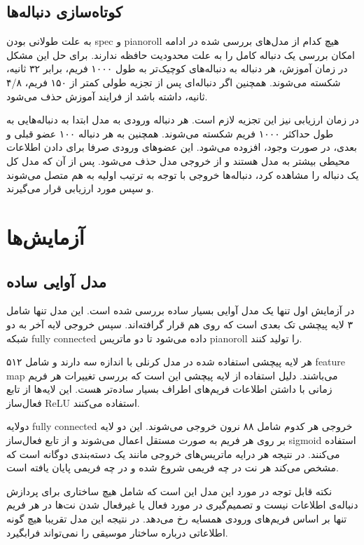 \subsection{کوتاه‌سازی دنباله‌ها}
به علت طولانی بودن \gls{spec} و \gls{pianoroll} هیچ کدام از مدل‌های بررسی شده در
ادامه امکان بررسی یک دنباله کامل را به علت محدودیت حافظه ندارند. برای حل این
مشکل در زمان آموزش، هر دنباله به دنباله‌های کوچیک‌تر به طول ۱۰۰۰ فریم، برابر ۳۲
ثانیه، شکسته می‌شوند. همچنین اگر دنباله‌ای پس از تجزیه طولی کمتر از ۱۵۰ فریم، ۴/۸
ثانیه، داشته باشد از فرایند آموزش حذف می‌شود.

در زمان ارزیابی نیز این تجزیه لازم است. هر دنباله ورودی به مدل ابتدا به
دنباله‌هایی به طول حداکثر ۱۰۰۰ فریم شکسته می‌شوند. همچنین به هر دنباله ۱۰۰ عضو
قبلی و بعدی، در صورت وجود، افزوده می‌شود. این عضوهای ورودی صرفا برای دادن
اطلاعات محیطی بیشتر به مدل هستند و از خروجی مدل حذف می‌شود. پس از آن که مدل کل
یک دنباله را مشاهده کرد، دنباله‌ها خروجی با توجه به ترتیب اولیه به هم متصل
می‌شوند و سپس مورد ارزیابی قرار می‌گیرند.

\section{آزمایش‌ها}
\subsection{مدل آوایی ساده}
در آزمایش اول تنها یک مدل آوایی بسیار ساده بررسی شده است. این مدل تنها شامل ۳
لایه پیچشی تک بعدی است که روی هم قرار گرافته‌اند. سپس خروجی لایه آخر به دو شبکه
\gls{fully connected} داده می‌شود تا دو ماتریس \gls{pianoroll} را تولید کنند.

هر لایه پیچشی استفاده شده در مدل کرنلی با اندازه سه دارند و شامل ۵۱۲
\gls{feature map} می‌باشند. دلیل استفاده از لایه پیچشی این است که بررسی تغییرات
هر فریم زمانی با داشتن اطلاعات فریم‌های اطراف بسیار ساده‌تر هست. این لایه‌ها از
تابع فعال‌ساز ReLU استفاده می‌کنند.

دولایه \gls{fully connected} خروجی هر کدوم شامل ۸۸ نرون خروجی می‌شوند. این دو
لایه بر روی هر فریم به صورت مستقل اعمال می‌شوند و از تابع فعال‌ساز sigmoid
استفاده می‌کنند. در نتیجه هر درایه ماتریس‌های خروجی مانند یک دسته‌بندی دوگانه
است که مشخص می‌کند هر نت در چه فریمی شروع شده و در چه فریمی پایان یافته است.

نکته قابل توجه در مورد این مدل این است که شامل هیچ ساختاری برای پردازش دنباله‌ی
اطلاعات نیست و تصمیم‌گیری در مورد فعال یا غیرفعال شدن نت‌ها در هر فریم تنها
بر اساس فریم‌های ورودی همسایه رخ می‌دهد. در نتیجه این مدل تقریبا هیچ گونه
اطلاعاتی درباره ساختار موسیقی را نمی‌تواند فرابگیرد.

